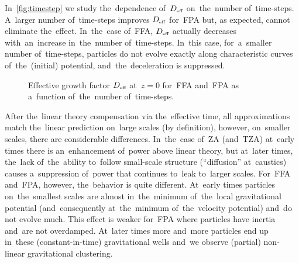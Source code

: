 In~\autoref{fig:timestep} we study the~dependence of~$D_\text{\tiny eff}$ on~the~number of~time-steps. A~larger number of~time-steps improves $D_\text{\tiny eff}$ for~FPA but, as expected, cannot eliminate the~effect. In~the~case of~FFA, $D_\text{\tiny eff}$ actually decreases with~an~increase in~the~number of~time-steps. In~this case, for~a~smaller number of~time-steps, particles do not evolve exactly along characteristic curves of~the~(initial) potential, and~the~deceleration is suppressed.
\begin{figure}[!bt]
  \centering
    \begin{subfigure}{0.9\textwidth}
	\end{subfigure}
	\begin{subfigure}{0.9\textwidth}
	\end{subfigure}
  \caption{Effective growth factor $D_\text{\tiny eff}$ at~$z=0$ for~FFA and~FPA as a~function of~the~number of~time-steps.}
  \label{fig:timestep}
\end{figure}

After the~linear theory compensation via the~effective time, all approximations match the~linear prediction on~large scales (by definition), however, on~smaller scales, there are considerable differences. In~the~case of~ZA (and~TZA) at~early times there is an~enhancement of~power above linear theory, but at~later times, the~lack of~the~ability to~follow small-scale structure (``diffusion'' at~caustics) causes a~suppression of~power that continues to~leak to~larger scales. For~FFA and~FPA, however, the~behavior is quite different. At~early times particles on~the~smallest scales are almost in~the~minimum of~the~local gravitational potential (and~consequently at~the~minimum of~the~velocity potential) and~do not evolve much. This effect is weaker for~FPA where particles have inertia and~are not overdamped. At~later times more and~more particles end up in~these (constant-in-time) gravitational wells and~we observe (partial) non-linear gravitational clustering.
 
